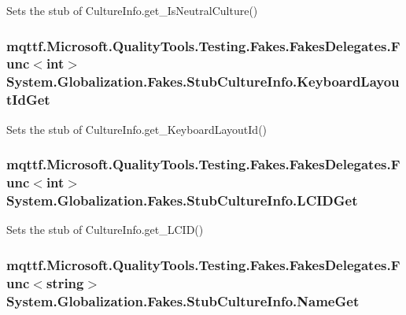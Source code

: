 Sets the stub of Culture\-Info.\-get\-\_\-\-Is\-Neutral\-Culture()

\hypertarget{class_system_1_1_globalization_1_1_fakes_1_1_stub_culture_info_a1c3349ad2684f69f0f032cf506fad1aa}{
\subsubsection[{Keyboard\-Layout\-Id\-Get}]{\setlength{\rightskip}{0pt plus 5cm}mqttf.\-Microsoft.\-Quality\-Tools.\-Testing.\-Fakes.\-Fakes\-Delegates.\-Func$<$int$>$ System.\-Globalization.\-Fakes.\-Stub\-Culture\-Info.\-Keyboard\-Layout\-Id\-Get}}\label{class_system_1_1_globalization_1_1_fakes_1_1_stub_culture_info_a1c3349ad2684f69f0f032cf506fad1aa}


Sets the stub of Culture\-Info.\-get\-\_\-\-Keyboard\-Layout\-Id()

\hypertarget{class_system_1_1_globalization_1_1_fakes_1_1_stub_culture_info_a9262bc8cb14fb18f324fe9f1720be197}{
\subsubsection[{L\-C\-I\-D\-Get}]{\setlength{\rightskip}{0pt plus 5cm}mqttf.\-Microsoft.\-Quality\-Tools.\-Testing.\-Fakes.\-Fakes\-Delegates.\-Func$<$int$>$ System.\-Globalization.\-Fakes.\-Stub\-Culture\-Info.\-L\-C\-I\-D\-Get}}\label{class_system_1_1_globalization_1_1_fakes_1_1_stub_culture_info_a9262bc8cb14fb18f324fe9f1720be197}


Sets the stub of Culture\-Info.\-get\-\_\-\-L\-C\-I\-D()

\hypertarget{class_system_1_1_globalization_1_1_fakes_1_1_stub_culture_info_a858f0c485e2ced6ee70658980cbacef4}{
\subsubsection[{Name\-Get}]{\setlength{\rightskip}{0pt plus 5cm}mqttf.\-Microsoft.\-Quality\-Tools.\-Testing.\-Fakes.\-Fakes\-Delegates.\-Func$<$string$>$ System.\-Globalization.\-Fakes.\-Stub\-Culture\-Info.\-Name\-Get}}\label{class_system_1_1_globalization_1_1_fakes_1_1_stub_culture_info_a858f0c485e2ced6ee70658980cbacef4}



